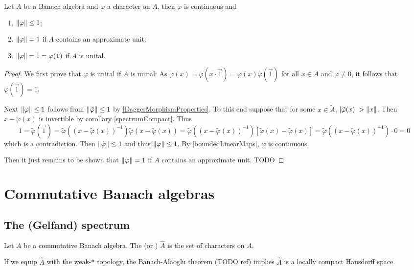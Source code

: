 \begin{proposition} \label{charactersUnital} \label{charactersContinuous}
Let $A$ be a Banach algebra and $\varphi$ a character on $A$, then $\varphi$ is continuous and
\begin{enumerate}
\item $\lVert\varphi\rVert\leq 1$;
\item $\lVert\varphi\rVert = 1$ if $A$ contains an approximate unit;
\item $\lVert\varphi\rVert = 1 = \varphi(\boldsymbol{\mathrm{1}})$ if $A$ is unital.
\end{enumerate}
\end{proposition}
\begin{proof}
We first prove that $\varphi$ is unital if $A$ is unital: As $\varphi(x) = \varphi(x\cdot\vec{1}) = \varphi(x)\varphi(\vec{1})$ for all $x\in A$ and $\varphi \neq 0$, it follows that $\varphi(\vec{1}) = 1$.

Next $\lVert\varphi\rVert\leq 1$ follows from $\lVert\tilde{\varphi}\rVert \leq 1$ by \ref{DaggerMorphismProperties}. To this end suppose that for some $x\in \tilde{A}$, $|\tilde{\varphi}(x)|>\norm{x}$. Then $x-\tilde{\varphi}(x)$ is invertible by corollary \ref{spectrumCompact}. Thus
\[ 1 = \tilde{\varphi}(\vec{1}) = \tilde{\varphi}((x-\tilde{\varphi}(x))^{-1})\tilde{\varphi}(x-\tilde{\varphi}(x)) = \tilde{\varphi}((x-\tilde{\varphi}(x))^{-1})[\tilde{\varphi}(x)-\tilde{\varphi}(x)] = \tilde{\varphi}((x-\tilde{\varphi}(x))^{-1})\cdot 0 = 0 \]
which is a contradiction. Then $\lVert\tilde{\varphi}\rVert \leq 1$ and thus $\lVert\varphi\rVert \leq 1$. By \ref{boundedLinearMaps}, $\varphi$ is continuous.

Then it just remains to be shown that $\lVert\varphi\rVert = 1$ if $A$ contains an approximate unit. TODO
\end{proof}


\section{Commutative Banach algebras}
\subsection{The (Gelfand) spectrum}
\begin{definition}
Let $A$ be a commutative Banach algebra. The  (or ) $\hat{A}$ is the set of characters on $A$.
\end{definition}
If we equip $\hat{A}$ with the weak-$*$ topology, the Banach-Alaoglu theorem (TODO ref) implies $\hat{A}$ is a locally compact Hausdorff space.

